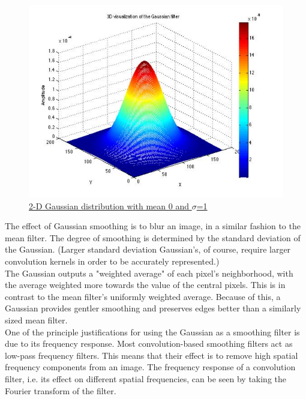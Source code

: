 \begin{figure}[h]
	\centering
	\includegraphics[width=1\textwidth]{figures/Implementation/Gaussian2D.png}
	\captionsetup{labelformat=empty}
	\caption{\href{https://stackoverflow.com/questions/23981437/visualization-of-gaussian-laplacian-etc-filters-in-matlab}
	{2-D Gaussian distribution with mean 0 and $\sigma$=1}}
\end{figure}

The effect of Gaussian smoothing is to blur an image, in a similar fashion to the mean filter. The degree of smoothing is determined by the standard deviation of the Gaussian. (Larger standard deviation Gaussian's, of course, require larger convolution kernels in order to be accurately represented.)\\

The Gaussian outputs a "weighted average" of each pixel's neighborhood, with the average weighted more towards the value of the central pixels. This is in contrast to the mean filter's uniformly weighted average. Because of this, a Gaussian provides gentler smoothing and preserves edges better than a similarly sized mean filter.\\

One of the principle justifications for using the Gaussian as a smoothing filter is due to its frequency response. Most convolution-based smoothing filters act as low-pass frequency filters. This means that their effect is to remove high spatial frequency components from an image. The frequency response of a convolution filter, i.e. its effect on different spatial frequencies, can be seen by taking the Fourier transform of the filter.\\

